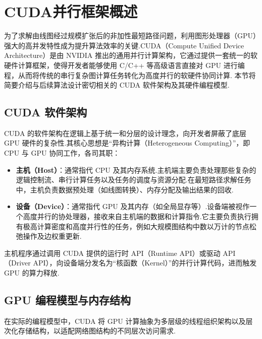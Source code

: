 \section{CUDA并行框架概述}

为了求解由线图经过规模扩张后的非加性最短路径问题，利用图形处理器（GPU）强大的高并发特性成为提升算法效率的关键.CUDA（Compute Unified Device Architecture）是由 NVIDIA 推出的通用并行计算架构，它通过提供一套统一的软硬件计算框架，使得开发者能够使用 C/C++ 等高级语言直接对 GPU 进行编程，从而将传统的串行复杂图计算任务转化为高度并行的软硬件协同计算.
本节将简要介绍与后续算法设计密切相关的 CUDA 软件架构及其硬件编程模型.

\subsection{CUDA 软件架构}

CUDA 的软件架构在逻辑上基于统一和分层的设计理念，向开发者屏蔽了底层 GPU 硬件的复杂性.其核心思想是“异构计算（Heterogeneous Computing）”，即 CPU 与 GPU 协同工作，各司其职：
\begin{itemize}
    \item \textbf{主机（Host）}：通常指代 CPU 及其内存系统.主机端主要负责处理那些复杂的逻辑控制流、串行计算任务以及任务的调度与资源分配.在最短路径求解任务中，主机负责数据预处理（如线图转换）、内存分配及输出结果的回收.
    \item \textbf{设备（Device）}：通常指代 GPU 及其内存（如全局显存等）.设备端被视作一个高度并行的协处理器，接收来自主机端的数据和计算指令.它主要负责执行拥有极高计算密度和高度并行性的任务，例如大规模图结构中数以万计的节点松弛操作及边权重更新.
\end{itemize}
主机程序通过调用 CUDA 提供的运行时 API（Runtime API）或驱动 API（Driver API），向设备端分发名为“核函数（Kernel）”的并行计算代码，进而触发 GPU 的算力释放.

\subsection{GPU 编程模型与内存结构}

在实际的编程模型中，CUDA 将 GPU 计算抽象为多层级的线程组织架构以及层次化存储结构，以适配网络图结构的不同层次访问需求.


